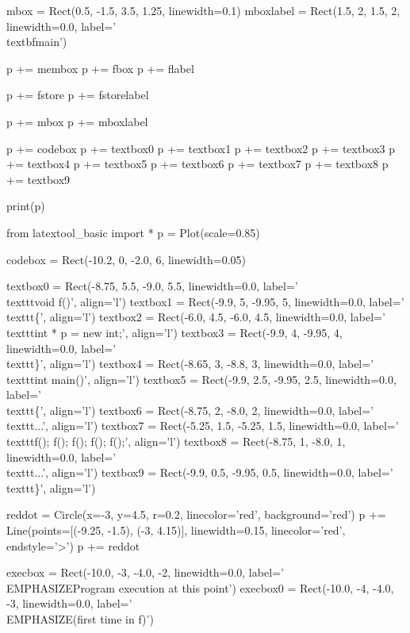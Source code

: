 \begin{python}
mbox = Rect(0.5, -1.5, 3.5, 1.25, linewidth=0.1)
mboxlabel = Rect(1.5, 2, 1.5, 2, linewidth=0.0, label='\\textbf{main}')

p += membox
p += fbox
p += flabel

p += fstore
p += fstorelabel

p += mbox
p += mboxlabel

p += codebox
p += textbox0
p += textbox1
p += textbox2
p += textbox3
p += textbox4
p += textbox5
p += textbox6
p += textbox7
p += textbox8
p += textbox9

print(p)
\end{python}

\begin{python}
from latextool_basic import *
p = Plot(scale=0.85)

codebox = Rect(-10.2, 0, -2.0, 6, linewidth=0.05)

textbox0 = Rect(-8.75, 5.5, -9.0, 5.5, linewidth=0.0, label='\\texttt{void f()}', align='l')
textbox1 = Rect(-9.9, 5, -9.95, 5, linewidth=0.0, label='\\texttt{\{}', align='l')
textbox2 = Rect(-6.0, 4.5, -6.0, 4.5, linewidth=0.0, label='\\texttt{int * p = new int;}', align='l')
textbox3 = Rect(-9.9, 4, -9.95, 4, linewidth=0.0, label='\\texttt{\}}', align='l')
textbox4 = Rect(-8.65, 3, -8.8, 3, linewidth=0.0, label='\\texttt{int main()}', align='l')
textbox5 = Rect(-9.9, 2.5, -9.95, 2.5, linewidth=0.0, label='\\texttt{\{}', align='l')
textbox6 = Rect(-8.75, 2, -8.0, 2, linewidth=0.0, label='\\texttt{...}', align='l')
textbox7 = Rect(-5.25, 1.5, -5.25, 1.5, linewidth=0.0, label='\\texttt{f(); f(); f(); f(); f();}', align='l')
textbox8 = Rect(-8.75, 1, -8.0, 1, linewidth=0.0, label='\\texttt{...}', align='l')
textbox9 = Rect(-9.9, 0.5, -9.95, 0.5, linewidth=0.0, label='\\texttt{\}}', align='l')

reddot = Circle(x=-3, y=4.5, r=0.2, linecolor='red', background='red')
p += Line(points=[(-9.25, -1.5), (-3, 4.15)], linewidth=0.15, linecolor='red', endstyle='>')
p += reddot

execbox = Rect(-10.0, -3, -4.0, -2, linewidth=0.0,
               label='\\EMPHASIZE{Program execution at this point}')
execbox0 = Rect(-10.0, -4, -4.0, -3, linewidth=0.0,
               label='\\EMPHASIZE{(first time in f)}')


\end{python}
